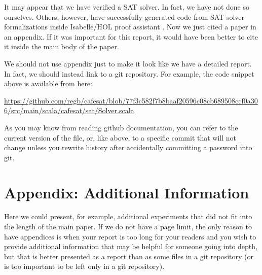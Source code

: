 \documentclass[a4paper,UKenglish,cleveref, autoref, thm-restate]{lipics-v2021}
\begin{document}

It may appear that we have verified a SAT solver. In fact, we have not done so ourselves.
Others, however, have successfully generated code from SAT solver formalizations inside Isabelle/HOL proof assistant
\cite{DBLP:conf/cade/BlanchetteFW16}. Now we just cited a paper in an appendix. If it was important for this report,
it would have been better to cite it inside the main body of the paper.

We should not use appendix just to make it look like we have a detailed report. In fact, we should instead link to a git repository.
For example, the code snippet above is available from here:
\begin{center}
  \url{https://github.com/regb/cafesat/blob/77f3c582f7b8baaf20596c08cb689508ccf0a306/src/main/scala/cafesat/sat/Solver.scala}
\end{center}
As you may know from reading github documentation, you can refer to the current version of the file, or, like above, to
a specific commit that will not change unless you rewrite history after accidentally committing a password into git.

\section{Appendix: Additional Information}\label{app:correctness}

Here we could present, for example, additional experiments
that did not fit into the length of the main paper.  If we
do not have a page limit, the only reason to have appendices
is when your report is too long for your readers and you
wish to provide additional information that may be helpful
for someone going into depth, but that is better presented
as a report than as some files in a git repository (or is
too important to be left only in a git repository).
\end{document}
